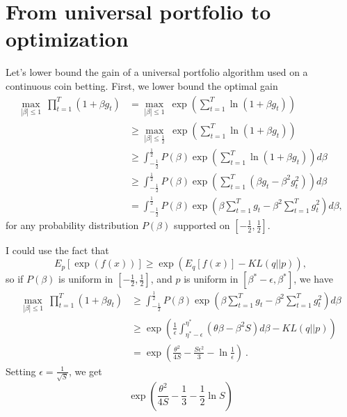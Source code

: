 \documentclass{colt2016_empty} %
\begin{document}
\section{From universal portfolio to optimization}

Let's lower bound the gain of a universal portfolio algorithm used on a continuous coin betting.
First, we lower bound the optimal gain
\begin{align}
\max_{|\beta|\leq 1} \ \prod_{t=1}^T (1+\beta g_t) 
&= \max_{|\beta|\leq 1} \ \exp\left(\sum_{t=1}^T \ln (1+\beta g_t) \right) \\
&\geq \max_{|\beta|\leq \frac{1}{2}} \ \exp\left(\sum_{t=1}^T \ln (1+\beta g_t) \right) \\
&\geq \int_{-\frac{1}{2}}^{\frac{1}{2}} P(\beta) \exp\left(\sum_{t=1}^T \ln (1+\beta g_t) \right) d \beta \\
&\geq \int_{-\frac{1}{2}}^{\frac{1}{2}} P(\beta) \exp\left(\sum_{t=1}^T (\beta g_t - \beta^2 g_t^2) \right) d \beta \\
&= \int_{-\frac{1}{2}}^{\frac{1}{2}} P(\beta) \exp\left(\beta \sum_{t=1}^T g_t - \beta^2 \sum_{t=1}^T g_t^2 \right) d \beta,
\end{align}
for any probability distribution $P(\beta)$ supported on $[-\tfrac{1}{2},\tfrac{1}{2}]$.

I could use the fact that
\[
E_p[\exp(f(x))] \geq \exp\left(E_q[f(x)] - KL(q||p)\right),
\]
so if $P(\beta)$ is uniform in $[-\tfrac{1}{2},\tfrac{1}{2}]$, and $p$ is uniform in $[\beta^*-\epsilon,\beta^*]$, we have
\begin{align}
\max_{|\beta|\leq 1} \ \prod_{t=1}^T (1+\beta g_t) 
&\geq \int_{-\frac{1}{2}}^{\frac{1}{2}} P(\beta) \exp\left(\beta \sum_{t=1}^T g_t - \beta^2 \sum_{t=1}^T g_t^2 \right) d \beta \\
&\geq \exp\left(\frac{1}{\epsilon}\int_{\eta^*-\epsilon}^{\eta^*} (\theta \beta - \beta^2 S) d \beta - KL(q||p)\right) \\
&= \exp\left(\frac{\theta^2}{4 S} - \frac{S \epsilon^2}{3} - \ln\frac{1}{\epsilon}\right)~.
\end{align}
Setting $\epsilon=\tfrac{1}{\sqrt{S}}$, we get 
\[
\exp\left(\frac{\theta^2}{4 S} - \frac{1}{3} - \frac{1}{2}\ln S\right)
\]
\end{document}
